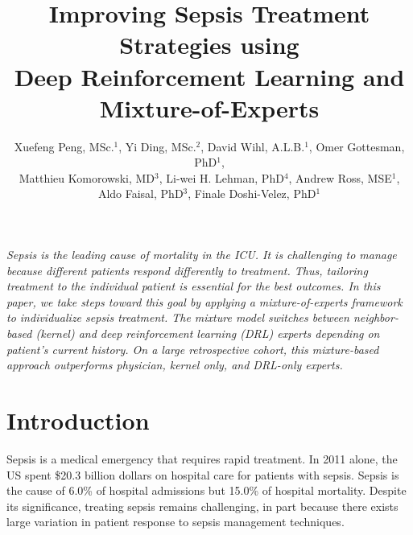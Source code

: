 \documentclass[10pt]{amia}
\begin{document}
\title{Improving Sepsis Treatment Strategies using \\Deep Reinforcement Learning and Mixture-of-Experts}

\author{Xuefeng Peng, MSc.$^{1}$, Yi Ding, MSc.$^{2}$, David Wihl, A.L.B.$^{1}$, Omer Gottesman, PhD$^{1}$,\\
Matthieu Komorowski, MD$^{3}$, Li-wei H. Lehman, PhD$^{4}$, Andrew Ross, MSE$^{1}$,\\
Aldo Faisal, PhD$^{3}$, Finale Doshi-Velez, PhD$^{1}$}


\maketitle



\textit{Sepsis is the leading cause of mortality in the ICU.  It is challenging to manage because different patients respond differently to treatment.  Thus, tailoring treatment to the individual patient is essential for the best outcomes.  In this paper, we take steps toward this goal by applying a mixture-of-experts framework to individualize sepsis treatment. The mixture model switches between neighbor-based (kernel) and deep reinforcement learning (DRL) experts depending on patient's current history.  On a large retrospective cohort, this mixture-based approach outperforms physician, kernel only, and DRL-only experts.}

\section*{Introduction}

Sepsis is a medical emergency that requires rapid treatment. \cite{seymour2017time} In 2011 alone, the US spent \$20.3 billion dollars on hospital care for patients with sepsis.\cite{pfuntner2006costs} Sepsis is the cause of 6.0\% of hospital admissions but 15.0\% of hospital mortality.\cite{rhee2017incidence} Despite its significance, treating sepsis remains challenging, in part because there exists large variation in patient response to sepsis management techniques.\cite{waechter2014interaction}  
\end{document}
